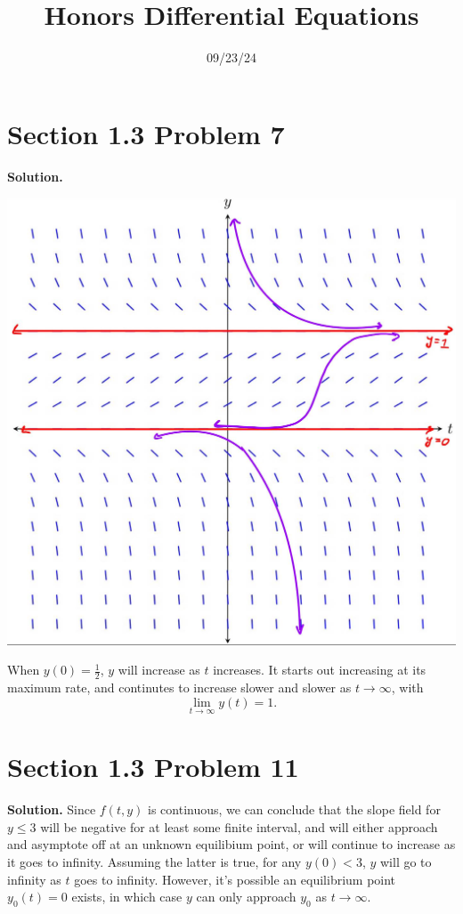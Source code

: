 \documentclass[11pt, letterpaper]{report}
\title{Honors Differential Equations}
\date{09/23/24}
\newenvironment{soln}[1][]{\noindent\textbf{Solution. }}{\hfill\qedsymbol}
\begin{document}
\makeproblem
\section*{Section 1.3 Problem 7}
\begin{soln}
\begin{center}
		\includegraphics[scale=0.2]{image0.jpg}
\end{center}
When $y(0)=\frac{1}{2}$, $y$ will increase as $t$ increases. It starts out increasing at its maximum rate, and continutes to increase slower and slower as $t\to \infty$, with
\[
	\lim_{t \to \infty} y(t)=1
.\]
\end{soln}
\section*{Section 1.3 Problem 11}
\begin{soln}
	Since $f(t,y)$ is continuous, we can conclude that the slope field for $y\leq 3$ will be negative for at least some finite interval, and will either approach and asymptote off at an unknown equilibium point, or will continue to increase as it goes to infinity. Assuming the latter is true, for any $y(0)<3$, $y$ will go to infinity as $t$ goes to infinity. However, it's possible an equilibrium point $y_0(t)=0$ exists, in which case $y$ can only approach $y_0$ as $t\to \infty$.
\end{soln}
\end{document}
